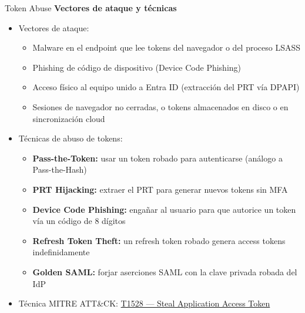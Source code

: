 \documentclass[aspectratio=169,11pt]{beamer}
\newcommand{\lead}[1]{{\bfseries #1}\par\medskip}
\begin{document}
\begin{frame}{Token Abuse}
\small
\lead{Vectores de ataque y técnicas}
  \begin{itemize}
  \item Vectores de ataque:
    \begin{itemize}
    \item Malware en el endpoint que lee tokens del navegador o del proceso LSASS
    \item Phishing de código de dispositivo (Device Code Phishing)
    \item Acceso físico al equipo unido a Entra ID (extracción del PRT vía DPAPI)
    \item Sesiones de navegador no cerradas, o tokens almacenados en disco o en sincronización cloud
    \end{itemize}
  \item Técnicas de abuso de tokens:
    \begin{itemize}
    \item \textbf{Pass-the-Token:} usar un token robado para autenticarse (análogo a Pass-the-Hash)
    \item \textbf{PRT Hijacking:} extraer el PRT para generar nuevos tokens sin MFA
    \item \textbf{Device Code Phishing:} engañar al usuario para que autorice un token vía un código de 8 dígitos
    \item \textbf{Refresh Token Theft:} un refresh token robado genera access tokens indefinidamente
    \item \textbf{Golden SAML:} forjar aserciones SAML con la clave privada robada del IdP
    \end{itemize}
  \item Técnica MITRE ATT\&CK: \href{https://attack.mitre.org/techniques/T1528/}{T1528 --- Steal Application Access Token}
  \end{itemize}
\end{frame}
\end{document}
